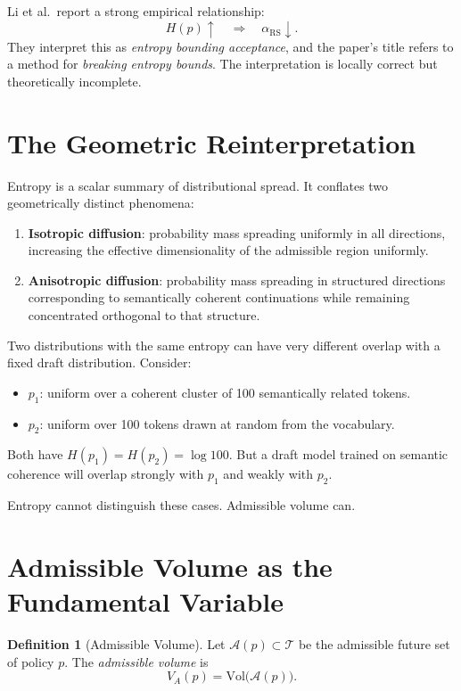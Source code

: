 \documentclass[11pt, a4paper, openany]{book}
\theoremstyle{plain}
\theoremstyle{definition}
\newtheorem{definition}[theorem]{Definition}
\theoremstyle{remark}
\newcommand{\RS}{\alpha_{\mathrm{RS}}}
\newcommand{\Vol}{\mathrm{Vol}}
\begin{document}
Li et al.\ report a strong empirical relationship:
\[
  H(p) \uparrow \quad \Rightarrow \quad \RS \downarrow.
\]
They interpret this as \emph{entropy bounding acceptance}, and the paper's
title refers to a method for \emph{breaking entropy bounds}.
The interpretation is locally correct but theoretically incomplete.

\section{The Geometric Reinterpretation}

Entropy is a scalar summary of distributional spread.
It conflates two geometrically distinct phenomena:
\begin{enumerate}
  \item \textbf{Isotropic diffusion}: probability mass spreading uniformly
    in all directions, increasing the effective dimensionality of the
    admissible region uniformly.
  \item \textbf{Anisotropic diffusion}: probability mass spreading in
    structured directions corresponding to semantically coherent continuations
    while remaining concentrated orthogonal to that structure.
\end{enumerate}

Two distributions with the same entropy can have very different overlap
with a fixed draft distribution.
Consider:
\begin{itemize}
  \item $p_1$: uniform over a coherent cluster of 100 semantically related tokens.
  \item $p_2$: uniform over 100 tokens drawn at random from the vocabulary.
\end{itemize}
Both have $H(p_1) = H(p_2) = \log 100$.
But a draft model trained on semantic coherence will overlap strongly with
$p_1$ and weakly with $p_2$.

Entropy cannot distinguish these cases.
Admissible volume can.

\section{Admissible Volume as the Fundamental Variable}

\begin{definition}[Admissible Volume]
  Let $\mathcal{A}(p) \subset \mathcal{T}$ be the admissible future set of
  policy $p$.
  The \emph{admissible volume} is
  \[
    V_A(p) = \Vol\!\bigl(\mathcal{A}(p)\bigr).
  \]
\end{definition}
\end{document}
